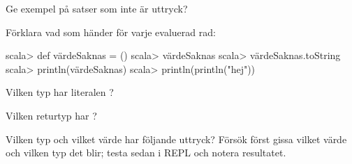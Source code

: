 \Subtask Ge exempel på satser som inte är uttryck?

\Subtask Förklara vad som händer för varje evaluerad rad:
\begin{REPL}
scala> def värdeSaknas = ()
scala> värdeSaknas
scala> värdeSaknas.toString
scala> println(värdeSaknas)
scala> println(println("hej"))
\end{REPL}

\Subtask Vilken typ har literalen \code{()}?

\Subtask Vilken returtyp har ?

\Task Vilken typ och vilket värde har följande uttryck?  Försök först gissa vilket värde och vilken typ det blir; testa sedan i REPL och notera resultatet. %

\Subtask {}

\Subtask {}

\Subtask {}

\Subtask {}

\Subtask {}

\Subtask {}

\Subtask {}

\Subtask {}

\Subtask {}

\Subtask \linebreak[0] 

\Subtask {}

\Subtask {}

\Subtask {}

\Subtask {}

